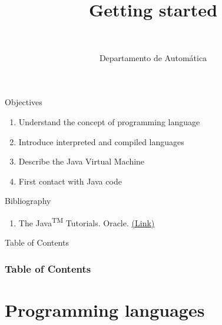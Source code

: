 \documentclass[10pt,compress]{beamer} %
\title[Getting started]{Getting started}
\author{\asignatura\\\carrera}
\institute{}
\date{Departamento de Automática}
\begin{document}
{\titlepageBlue
    \begin{frame}
        \titlepage
    \end{frame}
}

\begin{frame}[plain]{}
   \begin{block}{Objectives}
      \begin{enumerate}
         \item Understand the concept of programming language
         \item Introduce interpreted and compiled languages
         \item Describe the Java Virtual Machine
         \item First contact with Java code
      \end{enumerate} 
   \end{block}

   \begin{block}{Bibliography}
      \begin{enumerate}
          \item The Java\textsuperscript{TM} Tutorials. Oracle. \href{https://docs.oracle.com/javase/tutorial/}{(Link)}
      \end{enumerate} 
   \end{block}


\end{frame}

{
\begin{frame}[shrink]{Table of Contents}
 \frametitle{Table of Contents}
 \tableofcontents
\end{frame}
}

\section{Programming languages}
\end{document}
